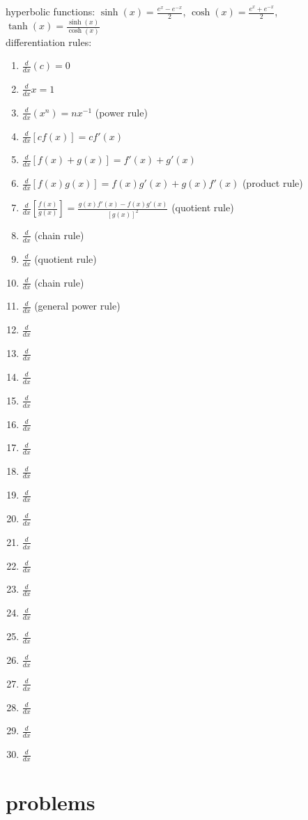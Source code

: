 \documentclass{article}
\begin{document}
hyperbolic functions: $\sinh(x) = \frac{e^x-e^{-x}}{2}$, $\cosh(x) = \frac{e^x+e^{-x}}{2}$, $\tanh(x) = \frac{\sinh(x)}{\cosh(x)}$\\

differentiation rules:
	\begin{enumerate}
		\item$\frac{d}{dx}(c) = 0$
		\item$\frac{d}{dx}x = 1$
		\item$\frac{d}{dx}(x^n) = nx^{-1}$ (power rule)
		\item$\frac{d}{dx}[cf(x)] = cf'(x)$
		\item$\frac{d}{dx}[f(x)+g(x)] = f'(x) + g'(x)$
		\item$\frac{d}{dx}[f(x)g(x)] = f(x)g'(x) + g(x)f'(x)$ (product rule)
		\item$\frac{d}{dx}[\frac{f(x)}{g(x)}] = \frac{g(x)f'(x) - f(x)g'(x)}{[g(x)]^2}$ (quotient rule)
		\item$\frac{d}{dx}$ (chain rule)
		\item$\frac{d}{dx}$ (quotient rule)
		\item$\frac{d}{dx}$ (chain rule)
		\item$\frac{d}{dx}$ (general power rule)
		\item$\frac{d}{dx}$ 
		\item$\frac{d}{dx}$
		\item$\frac{d}{dx}$
		\item$\frac{d}{dx}$
		\item$\frac{d}{dx}$
		\item$\frac{d}{dx}$
		\item$\frac{d}{dx}$
		\item$\frac{d}{dx}$
		\item$\frac{d}{dx}$
		\item$\frac{d}{dx}$
		\item$\frac{d}{dx}$
		\item$\frac{d}{dx}$
		\item$\frac{d}{dx}$
		\item$\frac{d}{dx}$
		\item$\frac{d}{dx}$
		\item$\frac{d}{dx}$
		\item$\frac{d}{dx}$
		\item$\frac{d}{dx}$
		\item$\frac{d}{dx}$	
	\end{enumerate}

	

\newpage
\section*{problems}	
				
\end{document}
